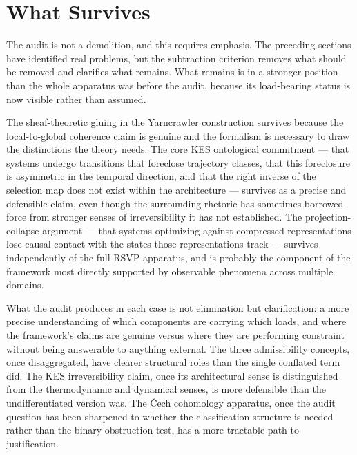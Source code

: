\documentclass[12pt, a4paper]{article}
\begin{document}
\section{What Survives}

The audit is not a demolition, and this requires emphasis. The preceding sections have identified real problems, but the subtraction criterion removes what should be removed and clarifies what remains. What remains is in a stronger position than the whole apparatus was before the audit, because its load-bearing status is now visible rather than assumed.

The sheaf-theoretic gluing in the Yarncrawler construction survives because the local-to-global coherence claim is genuine and the formalism is necessary to draw the distinctions the theory needs. The core KES ontological commitment --- that systems undergo transitions that foreclose trajectory classes, that this foreclosure is asymmetric in the temporal direction, and that the right inverse of the selection map does not exist within the architecture --- survives as a precise and defensible claim, even though the surrounding rhetoric has sometimes borrowed force from stronger senses of irreversibility it has not established. The projection-collapse argument --- that systems optimizing against compressed representations lose causal contact with the states those representations track --- survives independently of the full RSVP apparatus, and is probably the component of the framework most directly supported by observable phenomena across multiple domains.

What the audit produces in each case is not elimination but clarification: a more precise understanding of which components are carrying which loads, and where the framework's claims are genuine versus where they are performing constraint without being answerable to anything external. The three admissibility concepts, once disaggregated, have clearer structural roles than the single conflated term did. The KES irreversibility claim, once its architectural sense is distinguished from the thermodynamic and dynamical senses, is more defensible than the undifferentiated version was. The \v{C}ech cohomology apparatus, once the audit question has been sharpened to whether the classification structure is needed rather than the binary obstruction test, has a more tractable path to justification.
\end{document}
